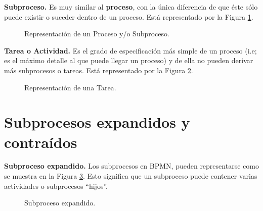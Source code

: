 {\bf Subproceso.} Es muy similar al {\bf proceso}, con la única diferencia de que éste sólo puede existir o suceder dentro de un proceso. Está representado por la Figura \ref{Intro:iProceso}.\\
 	\begin{figure}[!h]
 	\centering{}%
 	\caption{Representación de un Proceso y/o Subproceso.}
 	\label{Intro:iProceso}
 	\end{figure}

{\bf Tarea o Actividad.} Es el grado de especificación más simple de un proceso (i.e; es el máximo detalle al que puede llegar un proceso) y de ella no pueden derivar más subprocesos o tareas. Está representado por la Figura \ref{Intro:iTarea}.
 	\begin{figure}[!h]
 	\centering{}%
 	\caption{Representación de una Tarea.}
 	\label{Intro:iTarea}
 	\end{figure}


\section{Subprocesos expandidos y contraídos}

{\bf Subproceso expandido.} Los subprocesos en BPMN, pueden representarse como se muestra en la Figura \ref{Intro:ExpandedSubprocess}. Esto significa que un subproceso puede contener varias actividades o subprocesos ``hijos''.
	\begin{figure}[!h]
	\centering{}%
	\caption{Subproceso expandido.}
	\label{Intro:ExpandedSubprocess}
	\end{figure}

